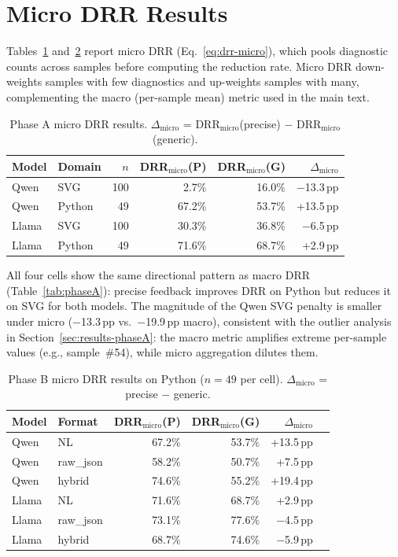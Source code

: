 \appendix

\section{Micro DRR Results}
\label{app:micro}

Tables~\ref{tab:micro-phaseA} and~\ref{tab:micro-phaseB} report micro DRR (Eq.~\ref{eq:drr-micro}), which pools diagnostic counts across samples before computing the reduction rate. Micro DRR down-weights samples with few diagnostics and up-weights samples with many, complementing the macro (per-sample mean) metric used in the main text.

\begin{table}[h]
\centering
\small
\caption{Phase A micro DRR results. $\Delta_\text{micro}$ = DRR$_\text{micro}$(precise) $-$ DRR$_\text{micro}$(generic).}
\label{tab:micro-phaseA}
\begin{tabular}{llrrrr}
\toprule
Model & Domain & $n$ & DRR$_\text{micro}$(P) & DRR$_\text{micro}$(G) & $\Delta_\text{micro}$ \\
\midrule
Qwen & SVG & 100 & 2.7\% & 16.0\% & $-$13.3\,pp \\
Qwen & Python & 49 & 67.2\% & 53.7\% & +13.5\,pp \\
Llama & SVG & 100 & 30.3\% & 36.8\% & $-$6.5\,pp \\
Llama & Python & 49 & 71.6\% & 68.7\% & +2.9\,pp \\
\bottomrule
\end{tabular}
\end{table}

All four cells show the same directional pattern as macro DRR (Table~\ref{tab:phaseA}): precise feedback improves DRR on Python but reduces it on SVG for both models. The magnitude of the Qwen SVG penalty is smaller under micro ($-$13.3\,pp vs.\ $-$19.9\,pp macro), consistent with the outlier analysis in Section~\ref{sec:results-phaseA}: the macro metric amplifies extreme per-sample values (e.g., sample~\#54), while micro aggregation dilutes them.

\begin{table}[h]
\centering
\small
\caption{Phase B micro DRR results on Python ($n = 49$ per cell). $\Delta_\text{micro}$ = precise $-$ generic.}
\label{tab:micro-phaseB}
\begin{tabular}{llrrrr}
\toprule
Model & Format & DRR$_\text{micro}$(P) & DRR$_\text{micro}$(G) & $\Delta_\text{micro}$ \\
\midrule
Qwen & NL & 67.2\% & 53.7\% & +13.5\,pp \\
Qwen & raw\_json & 58.2\% & 50.7\% & +7.5\,pp \\
Qwen & hybrid & 74.6\% & 55.2\% & +19.4\,pp \\
\midrule
Llama & NL & 71.6\% & 68.7\% & +2.9\,pp \\
Llama & raw\_json & 73.1\% & 77.6\% & $-$4.5\,pp \\
Llama & hybrid & 68.7\% & 74.6\% & $-$5.9\,pp \\
\bottomrule
\end{tabular}
\end{table}

